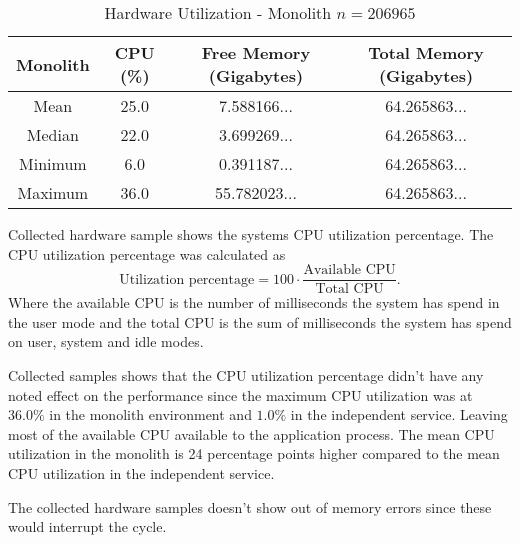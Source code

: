 \begin{table}[h!]
    \begin{tabular}{|c|c|c|c|} 
        \hline
        Monolith
        & CPU (\%)
        & Free Memory (Gigabytes)
        & Total Memory (Gigabytes) \\ [0.5ex] 
        
        \hline\hline
        Mean
        & 25.0
        & 7.588166...
        & 64.265863... \\ 
        
        Median
        & 22.0
        & 3.699269...
        & 64.265863... \\ 

        Minimum
        & 6.0
        & 0.391187...
        & 64.265863... \\ 
        
        Maximum
        & 36.0
        & 55.782023...
        & 64.265863... \\
        \hline
    \end{tabular}
    \caption{Hardware Utilization - Monolith $n=206 965$}
    \label{table:hardware results:monolith:1}
\end{table}

Collected hardware sample shows the systems CPU utilization percentage.
The CPU utilization percentage was calculated as
\[
\text{Utilization percentage} = 100 \cdot \frac{\text{Available CPU}}{\text{Total CPU}}
.\]
Where the available CPU is the number of milliseconds the system has spend in the user mode and the total CPU is the sum of milliseconds the system has spend on user, system and idle modes.

Collected samples shows that the CPU utilization percentage didn't have any noted effect on the performance since the maximum CPU utilization was at $36.0\%$ in the monolith environment and $1.0\%$ in the independent service.
Leaving most of the available CPU available to the application process.
The mean CPU utilization in the monolith is 24 percentage points higher compared to the mean CPU utilization in the independent service.


The collected hardware samples doesn't show out of memory errors since these would interrupt the cycle. 



